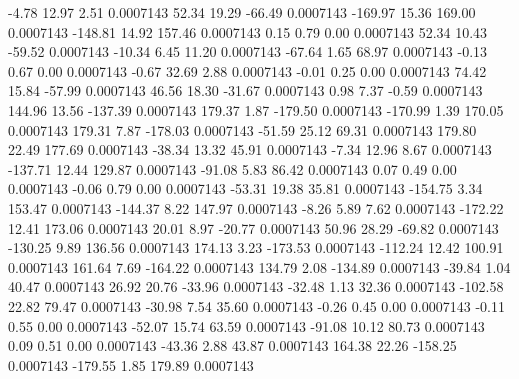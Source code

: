        -4.78       12.97        2.51     0.0007143
       52.34       19.29      -66.49     0.0007143
     -169.97       15.36      169.00     0.0007143
     -148.81       14.92      157.46     0.0007143
        0.15        0.79        0.00     0.0007143
       52.34       10.43      -59.52     0.0007143
      -10.34        6.45       11.20     0.0007143
      -67.64        1.65       68.97     0.0007143
       -0.13        0.67        0.00     0.0007143
       -0.67       32.69        2.88     0.0007143
       -0.01        0.25        0.00     0.0007143
       74.42       15.84      -57.99     0.0007143
       46.56       18.30      -31.67     0.0007143
        0.98        7.37       -0.59     0.0007143
      144.96       13.56     -137.39     0.0007143
      179.37        1.87     -179.50     0.0007143
     -170.99        1.39      170.05     0.0007143
      179.31        7.87     -178.03     0.0007143
      -51.59       25.12       69.31     0.0007143
      179.80       22.49      177.69     0.0007143
      -38.34       13.32       45.91     0.0007143
       -7.34       12.96        8.67     0.0007143
     -137.71       12.44      129.87     0.0007143
      -91.08        5.83       86.42     0.0007143
        0.07        0.49        0.00     0.0007143
       -0.06        0.79        0.00     0.0007143
      -53.31       19.38       35.81     0.0007143
     -154.75        3.34      153.47     0.0007143
     -144.37        8.22      147.97     0.0007143
       -8.26        5.89        7.62     0.0007143
     -172.22       12.41      173.06     0.0007143
       20.01        8.97      -20.77     0.0007143
       50.96       28.29      -69.82     0.0007143
     -130.25        9.89      136.56     0.0007143
      174.13        3.23     -173.53     0.0007143
     -112.24       12.42      100.91     0.0007143
      161.64        7.69     -164.22     0.0007143
      134.79        2.08     -134.89     0.0007143
      -39.84        1.04       40.47     0.0007143
       26.92       20.76      -33.96     0.0007143
      -32.48        1.13       32.36     0.0007143
     -102.58       22.82       79.47     0.0007143
      -30.98        7.54       35.60     0.0007143
       -0.26        0.45        0.00     0.0007143
       -0.11        0.55        0.00     0.0007143
      -52.07       15.74       63.59     0.0007143
      -91.08       10.12       80.73     0.0007143
        0.09        0.51        0.00     0.0007143
      -43.36        2.88       43.87     0.0007143
      164.38       22.26     -158.25     0.0007143
     -179.55        1.85      179.89     0.0007143
